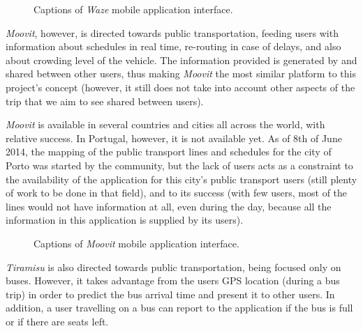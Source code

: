 \begin{figure}[h]
\begin{center}
\leavevmode
{} \hspace{1em}%
\caption{Captions of \emph{Waze} mobile application interface.}
\label{fig:waze}
\end{center}
\end{figure}

\emph{Moovit}, however, is directed towards public transportation, feeding users with information about schedules in real time, re-routing in case of  delays, and also about crowding level of the vehicle.
The information provided is generated by and shared between other users, thus making \emph{Moovit} the most similar platform to this project's concept (however, it still does not take into account other aspects of the trip that we aim to see shared between users).

\emph{Moovit} is available in several countries and cities all across the world, with relative success. 
In Portugal, however, it is not available yet. As of 8th of June 2014, the mapping of the public transport lines and schedules for the city of Porto was started by the community, but the lack of users acts as a constraint to the availability of the application for this city's public transport users (still plenty of work to be done in that field), and to its success (with few users, most of the lines would not have information at all, even during the day, because all the information in this application is supplied by its users). 

\begin{figure}[h]
\begin{center}
\leavevmode
{} \hspace{1em}%
\caption{Captions of \emph{Moovit} mobile application interface.}
\label{fig:moovit}
\end{center}
\end{figure}

\emph{Tiramisu} is also directed towards public transportation, being focused only on buses. However, it takes advantage from the users GPS location (during a bus trip) in order to predict the bus arrival time and present it to other users. In addition, a user travelling on a bus can report to the application if the bus is full or if there are seats left. 

